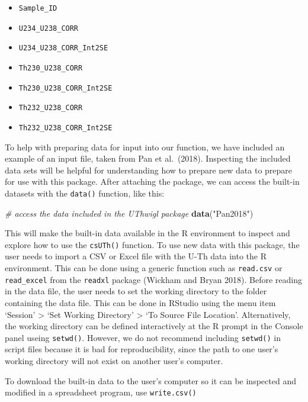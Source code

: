\documentclass[]{elsarticle} %
\providecommand{\tightlist}{%
  \setlength{\itemsep}{0pt}\setlength{\parskip}{0pt}}
\newenvironment{Shaded}{\begin{snugshade}}{\end{snugshade}}
\newcommand{\CommentTok}[1]{\textcolor[rgb]{0.56,0.35,0.01}{\textit{#1}}}
\newcommand{\KeywordTok}[1]{\textcolor[rgb]{0.13,0.29,0.53}{\textbf{#1}}}
\newcommand{\NormalTok}[1]{#1}
\newcommand{\StringTok}[1]{\textcolor[rgb]{0.31,0.60,0.02}{#1}}
\begin{document}
\begin{itemize}
\tightlist
\item
  \texttt{Sample\_ID}
\item
  \texttt{U234\_U238\_CORR}
\item
  \texttt{U234\_U238\_CORR\_Int2SE}
\item
  \texttt{Th230\_U238\_CORR}
\item
  \texttt{Th230\_U238\_CORR\_Int2SE}
\item
  \texttt{Th232\_U238\_CORR}
\item
  \texttt{Th232\_U238\_CORR\_Int2SE}
\end{itemize}

To help with preparing data for input into our function, we have included an example of an input file, taken from Pan et al.~(2018). Inspecting the included data sets will be helpful for understanding how to prepare new data to prepare for use with this package. After attaching the package, we can access the built-in datasets with the \texttt{data()} function, like this:

\begin{Shaded}
\begin{Highlighting}[]
\CommentTok{\# access the data included in the UThwigl package}
\KeywordTok{data}\NormalTok{(}\StringTok{"Pan2018"}\NormalTok{)}
\end{Highlighting}
\end{Shaded}

This will make the built-in data available in the R environment to inspect and explore how to use the \texttt{csUTh()} function. To use new data with this package, the user needs to import a CSV or Excel file with the U-Th data into the R environment. This can be done using a generic function such as \texttt{read.csv} or \texttt{read\_excel} from the \texttt{readxl} package (Wickham and Bryan 2018). Before reading in the data file, the user needs to set the working directory to the folder containing the data file. This can be done in RStudio using the menu item `Session' \textgreater{} `Set Working Directory' \textgreater{} `To Source File Location'. Alternatively, the working directory can be defined interactively at the R prompt in the Console panel useing \texttt{setwd()}. However, we do not recommend including \texttt{setwd()} in script files because it is bad for reproducibility, since the path to one user's working directory will not exist on another user's computer.

To download the built-in data to the user's computer so it can be inspected and modified in a spreadsheet program, use \texttt{write.csv()}
\end{document}
